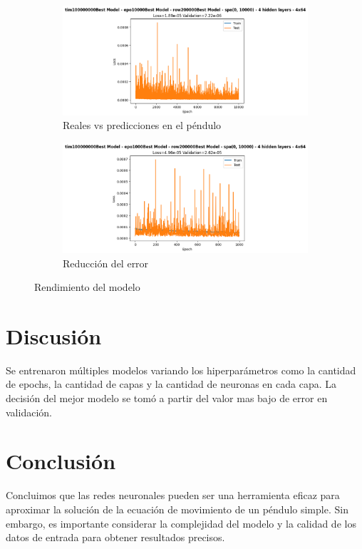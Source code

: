 \documentclass[a4paper,12pt]{article}
\begin{document}
\begin{figure}[H]
    \centering
    \begin{subfigure}{.7\linewidth}
        \centering
        \includegraphics[width=\textwidth]{true_vs_prediction_pendulum.png}
        \caption{Reales vs predicciones en el péndulo}
        \label{fig:true_vs_prediction_pendulum}
    \end{subfigure}
    \begin{subfigure}{.7\linewidth}
        \centering
        \includegraphics[width=\textwidth]{loss.png}
        \caption{Reducción del error}
        \label{fig:loss}
    \end{subfigure}
    \caption{Rendimiento del modelo}
\end{figure}

\section{Discusión}
Se entrenaron múltiples modelos variando los hiperparámetros como la cantidad de epochs, la cantidad de capas y la cantidad de neuronas en cada capa. La decisión del mejor modelo se tomó a partir del valor mas bajo de error en validación.



\section{Conclusión}
Concluimos que las redes neuronales pueden ser una herramienta eficaz para aproximar la solución de la ecuación de movimiento de un péndulo simple. Sin embargo, es importante considerar la complejidad del modelo y la calidad de los datos de entrada para obtener resultados precisos.
\end{document}
